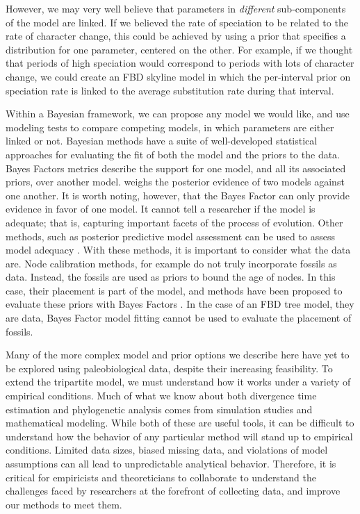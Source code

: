 However, we may very well believe that parameters in \textit{different} sub-components of the model are linked.
If we believed the rate of speciation to be related to the rate of character change,
this could be achieved by using a prior that specifies a distribution for one parameter, centered on the other.
For example, if we thought that periods of high speciation would correspond to periods with lots of character change, we could create an FBD skyline model in which the per-interval prior on speciation rate is linked to the average substitution rate during that interval.

Within a Bayesian framework, we can propose any model we would like, and use modeling tests to compare competing models, in which parameters are either linked or not.
Bayesian methods have a suite of well-developed statistical approaches for evaluating the fit of both the model and the priors to the data.
 Bayes Factors \citep{Xie2011}  metrics  describe the support for one model, and all its associated priors, over another model.
 weighs the posterior evidence of two models against one another.
It is worth noting, however, that the Bayes Factor can only provide evidence in favor of one model.
It cannot tell a researcher if the model is adequate; that is, capturing important facets of the process of evolution.
Other methods, such as posterior predictive model assessment can be used to assess model adequacy \citep{Brown2009, Brown2014, Duchene2015, Hoehna2018}.
With these methods, it is important to consider what the data are.
Node calibration methods, for example do not truly incorporate fossils as data.
Instead, the fossils are used as priors to bound the age of nodes.
In this case, their placement is part of the model, and methods have been proposed to evaluate these priors with Bayes Factors \citep{Andujar2014}. %
In the case of an FBD tree model, they are data,  Bayes Factor model fitting cannot be used to evaluate the placement of fossils.

Many of the more complex model and prior options we describe here have yet to be explored using paleobiological data, despite their increasing feasibility.
To extend the tripartite model, we must understand how it works under a variety of empirical conditions.
Much of what we know about both divergence time estimation and phylogenetic analysis comes from simulation studies and mathematical modeling.
While both of these are useful tools, it can be difficult to understand how the behavior of any particular method will stand up to empirical conditions.
Limited data sizes, biased missing data, and violations of model assumptions can all lead to unpredictable analytical behavior.
Therefore, it is critical for %
empiricists and theoreticians to collaborate to understand the challenges faced by researchers at the forefront of collecting data, and improve our methods to meet them.

